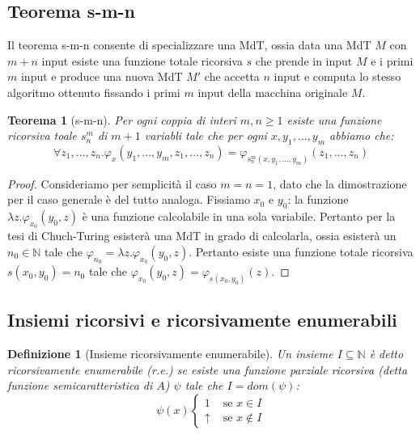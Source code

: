 \documentclass[a4paper,titlepage]{article}
\newtheorem{theorem}{Teorema}[section]
\newtheorem{definition}{Definizione}[section]
\theoremstyle{definition}
\newcommand{\N}{\mathbb{N}}
\begin{document}
\subsection{Teorema s-m-n}
Il teorema s-m-n consente di specializzare una MdT, ossia data una MdT $M$ con $m+n$ input esiste una funzione totale ricorsiva $s$ che prende in input $M$ e i primi $m$ input e produce una nuova MdT $M'$ che accetta $n$ input e computa lo stesso algoritmo ottenuto fissando i primi $m$ input della macchina originale $M$.

\begin{theorem}[s-m-n]
	Per ogni coppia di interi $m,n\geq 1$ esiste una funzione ricorsiva toale $s^m_n$ di $m+1$ variabli tale che per ogni $x,y_1,\dots,y_m$ abbiamo che:
\[
	\forall z_1,\dots,z_n.\varphi_x(y_1,\dots,y_m,z_1,\dots,z_n) = \varphi_{s^m_n(x, y_1,\dots,y_m)}(z_1,\dots,z_n)
\]
\end{theorem}
\begin{proof}
	Consideriamo per semplicità il caso $m=n=1$, dato che la dimostrazione per il caso generale è del tutto analoga. Fissiamo $x_0$ e $y_0$: la funzione $\lambda z. \varphi_{x_0}(y_0,z)$ è una funzione calcolabile in una sola variabile. Pertanto per la tesi di Chuch-Turing esisterà una MdT in grado di calcolarla, ossia esisterà un $n_0\in\N$ tale che $\varphi_{n_0}=\lambda z. \varphi_{x_0}(y_0,z)$. Pertanto esiste una funzione totale ricorsiva $s(x_0, y_0)=n_0$ tale che $\varphi_{x_0}(y_0,z)=\varphi_{s(x_0, y_0)}(z)$.
\end{proof}

\subsection{Insiemi ricorsivi e ricorsivamente enumerabili}
\begin{definition}[Insieme ricorsivamente enumerabile]
	Un insieme $I\subseteq\N$ è detto ricorsivamente enumerabile (r.e.) se esiste una funzione parziale ricorsiva (detta funzione semicaratteristica di $A$) $\psi$ tale che $I = dom(\psi)$:
	\[
		\psi(x) 
		\begin{cases}
			1 &\text{ se } x\in I\\
			\uparrow &\text{ se } x\notin I
		\end{cases}
	\]
\end{definition}
\end{document}
